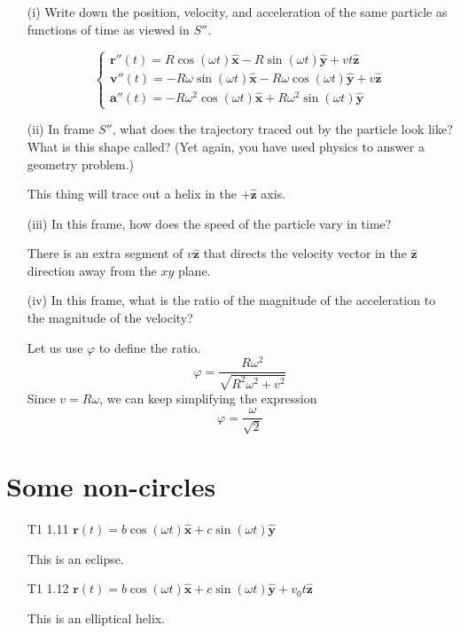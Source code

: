 \documentclass[12pt]{article}
\newcommand{\unx}{\hat{\mathbf{x}}}
\newcommand{\uny}{\hat{\mathbf{y}}}
\newcommand{\unz}{\hat{\mathbf{z}}}
\begin{document}
\begin{enumerate}
    \item[(i)] Write down the position, velocity, and acceleration of the same particle as functions of time as viewed in \(S''\).

    \[
    \begin{cases}
        \mathbf{r''}(t)  = R\cos(\omega t) \unx - R\sin(\omega t)\uny + vt\unz \\
        \mathbf{v''}(t)  = -R\omega\sin(\omega t)\unx  - R\omega\cos(\omega t)\uny + v\unz\\
        \mathbf{a''}(t)  = -R\omega^2\cos(\omega t) \unx + R\omega^2\sin(\omega t)\uny
    \end{cases}
    \]

    \item[(ii)] In frame \(S''\), what does the trajectory traced out by the particle look like? What is this shape called? (Yet again, you have used physics to answer a geometry problem.)

    This thing will trace out a helix in the $+\unz$ axis. 

    
    \item[(iii)] In this frame, how does the speed of the particle vary in time?

    There is an extra segment of $v\unz$ that directs the velocity vector in the $\unz$ direction away from the $xy$ plane. 
    
    \item[(iv)] In this frame, what is the ratio of the magnitude of the acceleration to the magnitude of the velocity?

    Let us use $\varphi$ to define the ratio.
    \[
    \varphi = \frac{R\omega^2}{\sqrt{R^2\omega^2+v^2}}
    \]
    Since $v = R\omega$, we can keep simplifying the expression
    \[
    \varphi = \frac{\omega}{\sqrt{2}}
    \]

    
\end{enumerate}


\section{Some non-circles}

\begin{enumerate}
    \item[T1 1.11] \( \mathbf{r}(t) = b\cos(\omega t)\unx + c\sin(\omega t)\uny \)

    This is an eclipse.
    
    \item[T1 1.12]\( \mathbf{r}(t) = b\cos(\omega t)\unx + c\sin(\omega t)\uny + v_0t\unz \)

    This is an elliptical helix. 
\end{enumerate}
\end{document}
